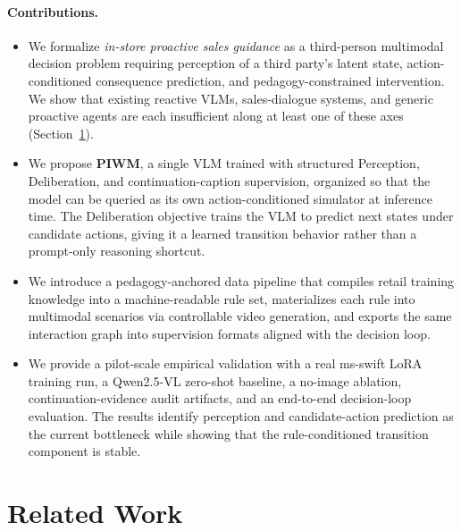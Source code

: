 \documentclass{article}
\begin{document}
\paragraph{Contributions.}
\begin{itemize}
  \item We formalize \emph{in-store proactive sales guidance} as a third-person multimodal decision problem requiring perception of a third party's latent state, action-conditioned consequence prediction, and pedagogy-constrained intervention. We show that existing reactive VLMs, sales-dialogue systems, and generic proactive agents are each insufficient along at least one of these axes (Section~\ref{sec:related}).
  \item We propose \textbf{PIWM}, a single VLM trained with structured Perception, Deliberation, and continuation-caption supervision, organized so that the model can be queried as its own action-conditioned simulator at inference time. The Deliberation objective trains the VLM to predict next states under candidate actions, giving it a learned transition behavior rather than a prompt-only reasoning shortcut.
  \item We introduce a pedagogy-anchored data pipeline that compiles retail training knowledge into a machine-readable rule set, materializes each rule into multimodal scenarios via controllable video generation, and exports the same interaction graph into supervision formats aligned with the decision loop.
  \item We provide a pilot-scale empirical validation with a real ms-swift LoRA training run, a Qwen2.5-VL zero-shot baseline, a no-image ablation, continuation-evidence audit artifacts, and an end-to-end decision-loop evaluation. The results identify perception and candidate-action prediction as the current bottleneck while showing that the rule-conditioned transition component is stable.
\end{itemize}


\section{Related Work}
\label{sec:related}
\end{document}
